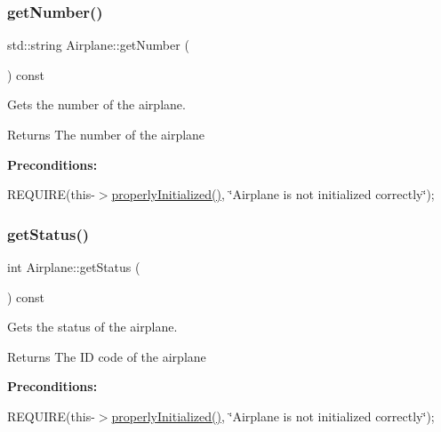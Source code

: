\subsubsection{\texorpdfstring{get\+Number()}{getNumber()}}
{\footnotesize\ttfamily std\+::string Airplane\+::get\+Number (\begin{DoxyParamCaption}{ }\end{DoxyParamCaption}) const}



Gets the number of the airplane. 

\begin{DoxyReturn}{Returns}
The number of the airplane
\end{DoxyReturn}
{\bfseries Preconditions\+:}
\begin{DoxyItemize}
\item R\+E\+Q\+U\+I\+RE(this-\/$>$\mbox{\hyperlink{class_airplane_a6f80df8f692cc8d67d292c1e9f26d59e}{properly\+Initialized()}}, \char`\"{}\+Airplane is not initialized correctly\char`\"{}); 
\end{DoxyItemize}\mbox{\label{class_airplane_ac1247e4c17755c544a7fcd709ca44c14}} 
\subsubsection{\texorpdfstring{get\+Status()}{getStatus()}}
{\footnotesize\ttfamily int Airplane\+::get\+Status (\begin{DoxyParamCaption}{ }\end{DoxyParamCaption}) const}



Gets the status of the airplane. 

\begin{DoxyReturn}{Returns}
The ID code of the airplane
\end{DoxyReturn}
{\bfseries Preconditions\+:}
\begin{DoxyItemize}
\item R\+E\+Q\+U\+I\+RE(this-\/$>$\mbox{\hyperlink{class_airplane_a6f80df8f692cc8d67d292c1e9f26d59e}{properly\+Initialized()}}, \char`\"{}\+Airplane is not initialized correctly\char`\"{}); 
\end{DoxyItemize}\mbox{\label{class_airplane_acd9fe7c6dd10492f6a7995c3d2ddc8ac}} 
